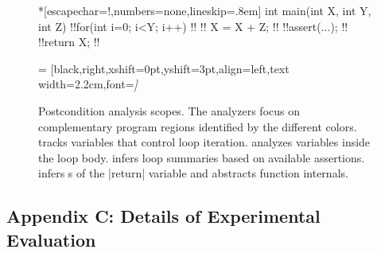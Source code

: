 \begin{figure}[H]
\begin{center}
\begin{minipage}{.7\textwidth}
\begin{outlisting}*[escapechar=!,numbers=none,lineskip=.8em]
int main(int X, int Y, int Z) {
    !!for(int i=0; i<Y; i++)              !!
    !!   X = X + Z;                       !!
    !!assert(...);                        !!
    !!return X;                           !!
}
\end{outlisting}
 = [black,right,xshift=0pt,yshift=3pt,align=left,text width=2.2cm,font=\itshape]
\end{minipage}
\end{center}
\caption[Postcondition analysis scopes]{
    Postcondition analysis scopes.
    The analyzers focus on complementary program regions identified by the different colors.
     tracks variables that control loop iteration.
    \ndx{\impl} analyzes variables inside the loop body.
     infers loop summaries based on available assertions.
     infers s of the \pr|return| variable and abstracts function internals.
}
\label{fig:comp-scope}
\end{figure}%

\subsection{Appendix C: Details of Experimental Evaluation}
\label{app:subsec:bench}

